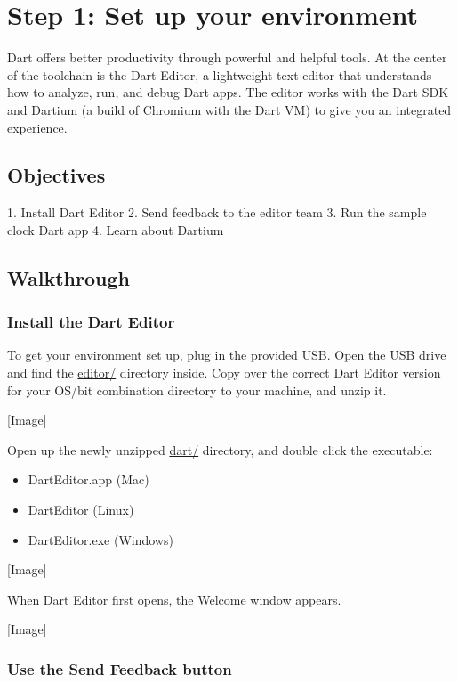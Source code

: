 \section{Step 1: Set up your environment}

Dart offers better productivity through powerful and helpful tools. At the center of the toolchain is the Dart Editor, a lightweight text editor that understands how to analyze, run, and debug Dart apps. The editor works with the Dart SDK and Dartium (a build of Chromium with the Dart VM) to give you an integrated experience.

\subsection{Objectives}

1. Install Dart Editor
2. Send feedback to the editor team
3. Run the sample clock Dart app
4. Learn about Dartium

\subsection{Walkthrough}

\subsubsection{Install the Dart Editor}

To get your environment set up, plug in the provided USB. Open the USB drive and find the \url{editor/} directory inside. Copy over the correct Dart Editor version for your OS/bit combination directory to your machine, and unzip it.

[Image]

Open up the newly unzipped \url{dart/} directory, and double click the executable:

\begin{itemize}
\item DartEditor.app (Mac)
\item DartEditor (Linux)
\item DartEditor.exe (Windows)
\end{itemize}

[Image]

When Dart Editor first opens, the Welcome window appears.

[Image]

\subsubsection{Use the Send Feedback button}

